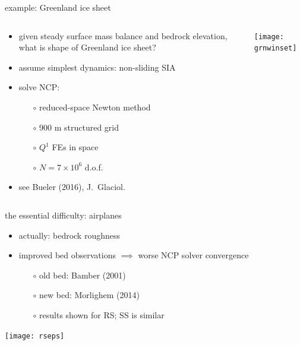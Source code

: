 \documentclass[xcolor={dvipsnames}]{beamer}
\begin{document}
\begin{frame}{example: Greenland ice sheet}

\begin{columns}
\begin{column}{0.6\textwidth}
\begin{itemize}
\item given steady surface mass balance and bedrock elevation, what is shape of Greenland ice sheet?
\item assume simplest dynamics: non-sliding SIA
\item solve NCP:
  \begin{itemize}
  \item[$\circ$] reduced-space Newton method
  \item[$\circ$] 900 m structured grid
  \item[$\circ$] $Q^1$ FEs in space
  \item[$\circ$] $N=7\times 10^6$ d.o.f.
  \end{itemize}
\item see Bueler (2016), J.~Glaciol.
\end{itemize}
\end{column}
\begin{column}{0.4\textwidth}
\vspace{-5mm}

\begin{center}
\texttt{[image: grnwinset]}
\end{center}
\end{column}
\end{columns}
\end{frame}



\begin{frame}{the essential difficulty: airplanes}

\begin{itemize}
\item actually: \alert{bedrock roughness}
\item improved bed observations $\implies$ worse NCP solver convergence
  \begin{itemize}
  \item[$\circ$] old bed: Bamber (2001)
  \item[$\circ$] new bed: Morlighem (2014)
  \item[$\circ$] results shown for RS; SS is similar
  \end{itemize}
\end{itemize}

\begin{center}
\texttt{[image: rseps]}
\end{center}
\end{frame}
\end{document}
